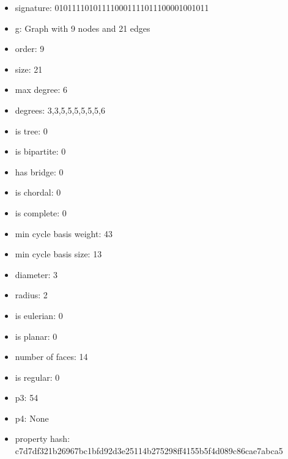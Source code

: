\newpage
\begin{figure}
\end{figure}
\begin{itemize}
\item signature: 010111101011110001111011100001001011
\item g: Graph with 9 nodes and 21 edges
\item order: 9
\item size: 21
\item max degree: 6
\item degrees: 3,3,5,5,5,5,5,5,6
\item is tree: 0
\item is bipartite: 0
\item has bridge: 0
\item is chordal: 0
\item is complete: 0
\item min cycle basis weight: 43
\item min cycle basis size: 13
\item diameter: 3
\item radius: 2
\item is eulerian: 0
\item is planar: 0
\item number of faces: 14
\item is regular: 0
\item p3: 54
\item p4: None
\item property hash: c7d7df321b26967bc1bfd92d3e25114b275298ff4155b5f4d089c86cae7abca5
\end{itemize}
